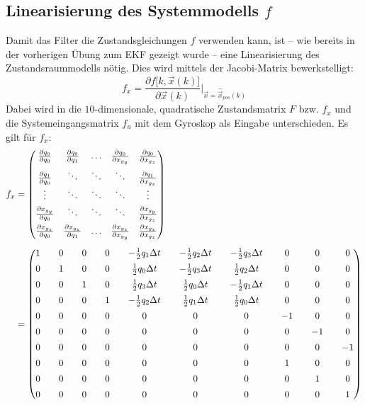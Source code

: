\documentclass[12pt,a4paper]{article}
\newcommand{\PA}[2]{\frac{\partial #1}{\partial #2}}
\begin{document}
		\subsection{Linearisierung des Systemmodells $f$}
		Damit das Filter die Zustandsgleichungen $f$ verwenden kann, ist -- wie bereits in der vorherigen Übung zum EKF gezeigt wurde -- eine Linearisierung des Zustandsraummodells nötig. Dies wird mittels der Jacobi-Matrix bewerkstelligt:
		\begin{equation}\label{eq:JacobiMatrixDefinitionZustandsmatrix}
			f_{x}=\frac{\partial f\big[k,\vec{x}(k)\big]}{\partial \vec{x}(k)}\Bigg \vert_{\vec{x}=\hat{\vec{x}}_{pos}(k)}
		\end{equation}
		Dabei wird in die $10$-dimensionale, quadratische Zustandsmatrix $F$ bzw. $f_{x}$ und die Systemeingangsmatrix $f_{u}$ mit dem Gyroskop als Eingabe unterschieden.
		Es gilt für $f_{x}$:
			\begin{align}\label{eq:ZustandsmatrixF}
				f_{x}&=\begin{pmatrix}
				\PA{q_{0}}{q_{0}} & \PA{q_{0}}{q_{1}} & \ldots & \PA{q_{0}}{x_{g_{y}}} & \PA{q_{0}}{x_{g_{z}}} \\[0.5em]
				\PA{q_{1}}{q_{0}} & \ddots & \ddots & \ddots & \PA{q_{1}}{x_{g_{z}}} \\
				\vdots & \ddots & \ddots & \ddots & \vdots \\
				\PA{x_{g_{y}}}{q_{0}} & \ddots & \ddots & \ddots & \PA{x_{g_{y}}}{x_{g_{z}}} \\[0.5em]
				\PA{x_{g_{z}}}{q_{0}} & \PA{x_{g_{z}}}{q_{1}} & \ldots & \PA{x_{g_{z}}}{x_{g_{y}}} & \PA{x_{g_{z}}}{x_{g_{z}}} 
				\end{pmatrix}\\[0.5em]
				&=
				\setlength{\arraycolsep}{10pt}
				\begin{pmatrix}
				1 & 0 & 0 & 0 & -\frac{1}{2}q_{1}\Delta t & -\frac{1}{2}q_{2}\Delta t & -\frac{1}{2}q_{3}\Delta t & 0 & 0 & 0 \\[0.5em]
				0 & 1 & 0 & 0 & \frac{1}{2}q_{0}\Delta t & -\frac{1}{2}q_{3}\Delta t & \frac{1}{2}q_{2}\Delta t & 0 & 0 & 0 \\[0.5em]
				0 & 0 & 1 & 0 & \frac{1}{2}q_{3}\Delta t & \frac{1}{2}q_{0}\Delta t & -\frac{1}{2}q_{1}\Delta t & 0 & 0 & 0 \\[0.5em]
				0 & 0 & 0 & 1 & -\frac{1}{2}q_{2}\Delta t & \frac{1}{2}q_{1}\Delta t & \frac{1}{2}q_{0}\Delta t & 0 & 0 & 0 \\[0.5em]
				0 & 0 & 0 & 0 & 0 & 0 & 0 & -1 & 0 & 0 \\[0.5em]
				0 & 0 & 0 & 0 & 0 & 0 & 0 & 0 & -1 & 0 \\[0.5em]
				0 & 0 & 0 & 0 & 0 & 0 & 0 & 0 & 0 & -1 \\[0.5em]
				0 & 0 & 0 & 0 & 0 & 0 & 0 & 1 & 0 & 0 \\[0.5em]
				0 & 0 & 0 & 0 & 0 & 0 & 0 & 0 & 1 & 0 \\[0.5em]
				0 & 0 & 0 & 0 & 0 & 0 & 0 & 0 & 0 & 1
				\end{pmatrix}
			\end{align}
\end{document}
